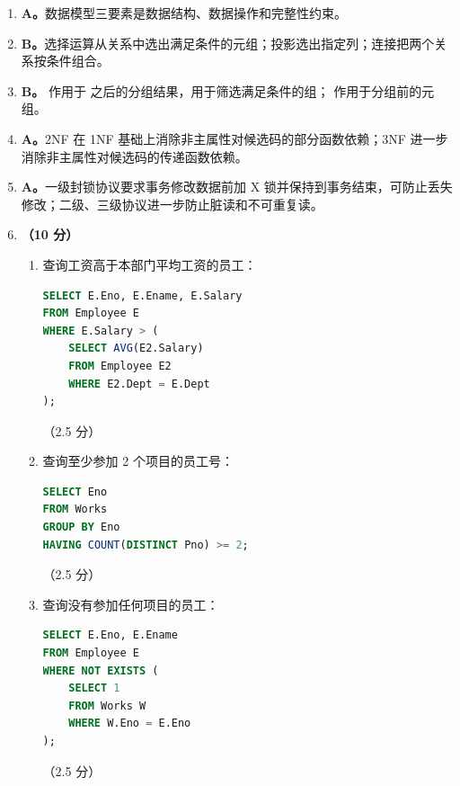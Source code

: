\documentclass[a4paper,11pt]{article}
\begin{document}

\begin{enumerate}[start=21, label=\textbf{\arabic*.}, leftmargin=2.4em, itemsep=0.45em]

\item \textbf{A。}数据模型三要素是数据结构、数据操作和完整性约束。

\item \textbf{B。}选择运算从关系中选出满足条件的元组；投影选出指定列；连接把两个关系按条件组合。

\item \textbf{B。} 作用于  之后的分组结果，用于筛选满足条件的组； 作用于分组前的元组。

\item \textbf{A。}2NF 在 1NF 基础上消除非主属性对候选码的部分函数依赖；3NF 进一步消除非主属性对候选码的传递函数依赖。

\item \textbf{A。}一级封锁协议要求事务修改数据前加 X 锁并保持到事务结束，可防止丢失修改；二级、三级协议进一步防止脏读和不可重复读。

\item \textbf{（10 分）}
\begin{enumerate}[label=（\arabic*）, leftmargin=2.2em, itemsep=2pt]
  \item 查询工资高于本部门平均工资的员工：
\begin{lstlisting}[language=SQL]
SELECT E.Eno, E.Ename, E.Salary
FROM Employee E
WHERE E.Salary > (
    SELECT AVG(E2.Salary)
    FROM Employee E2
    WHERE E2.Dept = E.Dept
);
\end{lstlisting}
\hfill（2.5 分）

  \item 查询至少参加 2 个项目的员工号：
\begin{lstlisting}[language=SQL]
SELECT Eno
FROM Works
GROUP BY Eno
HAVING COUNT(DISTINCT Pno) >= 2;
\end{lstlisting}
\hfill（2.5 分）

  \item 查询没有参加任何项目的员工：
\begin{lstlisting}[language=SQL]
SELECT E.Eno, E.Ename
FROM Employee E
WHERE NOT EXISTS (
    SELECT 1
    FROM Works W
    WHERE W.Eno = E.Eno
);
\end{lstlisting}
\hfill（2.5 分）


\end{enumerate}
\end{enumerate}
\end{document}
